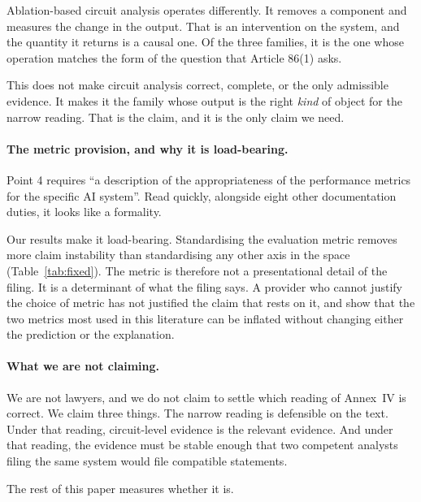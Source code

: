 \documentclass[letterpaper]{article} %
\begin{document}
Ablation-based circuit analysis operates differently. It removes a component and
measures the change in the output. That is an intervention on the system, and the
quantity it returns is a causal one. Of the three families, it is the one whose
operation matches the form of the question that Article 86(1) asks.

This does not make circuit analysis correct, complete, or the only admissible
evidence. It makes it the family whose output is the right \emph{kind} of object
for the narrow reading. That is the claim, and it is the only claim we need.

\paragraph{The metric provision, and why it is load-bearing.}
Point 4 requires ``a description of the appropriateness of the performance
metrics for the specific AI system''. Read quickly, alongside eight other
documentation duties, it looks like a formality.

Our results make it load-bearing. Standardising the evaluation metric removes
more claim instability than standardising any other axis in the space
(Table~\ref{tab:fixed}). The metric is therefore not a presentational detail of
the filing. It is a determinant of what the filing says. A provider who cannot
justify the choice of metric has not justified the claim that rests on it, and
\citet{hsia2023} show that the two metrics most used in this literature can be
inflated without changing either the prediction or the explanation.

\paragraph{What we are not claiming.}
We are not lawyers, and we do not claim to settle which reading of Annex~IV is
correct. We claim three things. The narrow reading is defensible on the text.
Under that reading, circuit-level evidence is the relevant evidence. And under
that reading, the evidence must be stable enough that two competent analysts
filing the same system would file compatible statements.

The rest of this paper measures whether it is.

%
\end{document}
